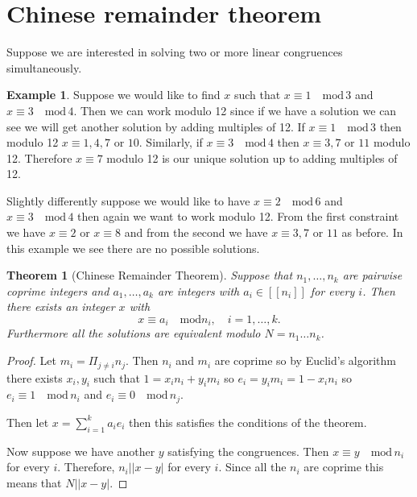 \documentclass[
]{book}
\newtheorem{theorem}{Theorem}[chapter]
\theoremstyle{definition}
\theoremstyle{definition}
\newtheorem{example}{Example}[chapter]
\theoremstyle{definition}
\theoremstyle{definition}
\theoremstyle{remark}
\begin{document}
\section{Chinese remainder theorem}\label{chinese-remainder-theorem}

Suppose we are interested in solving two or more linear congruences simultaneously.

\begin{example}
Suppose we would like to find \(x\) such that \(x \equiv 1 \quad \mbox{mod} \, 3\) and \(x \equiv 3 \quad \mbox{mod} \, 4\). Then we can work modulo 12 since if we have a solution we can see we will get another solution by adding multiples of 12. If \(x \equiv 1 \quad \mbox{mod} \, 3\) then modulo 12 \(x \equiv 1, 4, 7\) or \(10\). Similarly, if \(x \equiv 3 \quad \mbox{mod}\, 4\) then \(x \equiv 3, 7\) or \(11\) modulo 12. Therefore \(x \equiv 7\) modulo 12 is our unique solution up to adding multiples of 12.

Slightly differently suppose we would like to have \(x \equiv 2 \quad \mbox{mod} \, 6\) and \(x \equiv 3 \quad \mbox{mod} \, 4\) then again we want to work modulo 12. From the first constraint we have \(x \equiv 2\) or \(x \equiv 8\) and from the second we have \(x \equiv 3, 7\) or \(11\) as before. In this example we see there are no possible solutions.
\end{example}

\begin{theorem}[Chinese Remainder Theorem]
Suppose that \(n_1, \dots, n_k\) are pairwise coprime integers and \(a_1, \dots, a_k\) are integers with \(a_i \in [[n_i]]\) for every \(i\). Then there exists an integer \(x\) with
\[ x \equiv a_i \quad \mbox{mod} n_i, \quad i = 1, \dots, k.  \] Furthermore all the solutions are equivalent modulo \(N=n_1 \dots n_k\).
\end{theorem}

\begin{proof}
Let \(m_i = \Pi_{j \neq i} n_j\). Then \(n_i\) and \(m_i\) are coprime so by Euclid's algorithm there exists \(x_i,y_i\) such that \(1 = x_i n_i + y_i m_i\) so \(e_i =y_i m_i = 1- x_i n_i\) so \(e_i \equiv 1 \quad \mbox{mod} \, n_i\) and \(e_i \equiv 0 \quad \mbox{mod} \, n_j\).

Then let \(x = \sum_{i=1}^k a_i e_i\) then this satisfies the conditions of the theorem.

Now suppose we have another \(y\) satisfying the congruences. Then \(x \equiv y \quad \mbox{mod} \, n_i\) for every \(i\). Therefore, \(n_i| |x-y|\) for every \(i\). Since all the \(n_i\) are coprime this means that \(N | |x-y|\).
\end{proof}
\end{document}
